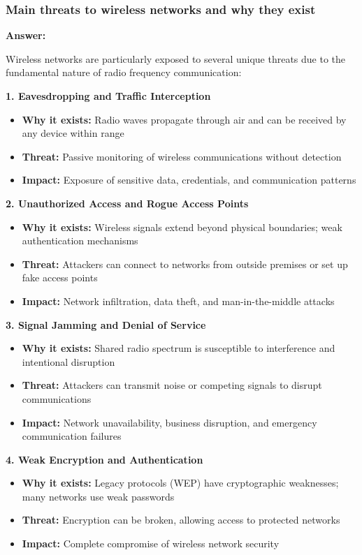 \documentclass[12pt,a4paper]{article}
\begin{document}
\subsubsection{Main threats to wireless networks and why they exist}

\textbf{Answer:}

Wireless networks are particularly exposed to several unique threats due to the fundamental nature of radio frequency communication:

\textbf{1. Eavesdropping and Traffic Interception}
\begin{itemize}
    \item \textbf{Why it exists:} Radio waves propagate through air and can be received by any device within range
    \item \textbf{Threat:} Passive monitoring of wireless communications without detection
    \item \textbf{Impact:} Exposure of sensitive data, credentials, and communication patterns
\end{itemize}

\textbf{2. Unauthorized Access and Rogue Access Points}
\begin{itemize}
    \item \textbf{Why it exists:} Wireless signals extend beyond physical boundaries; weak authentication mechanisms
    \item \textbf{Threat:} Attackers can connect to networks from outside premises or set up fake access points
    \item \textbf{Impact:} Network infiltration, data theft, and man-in-the-middle attacks
\end{itemize}

\textbf{3. Signal Jamming and Denial of Service}
\begin{itemize}
    \item \textbf{Why it exists:} Shared radio spectrum is susceptible to interference and intentional disruption
    \item \textbf{Threat:} Attackers can transmit noise or competing signals to disrupt communications
    \item \textbf{Impact:} Network unavailability, business disruption, and emergency communication failures
\end{itemize}

\textbf{4. Weak Encryption and Authentication}
\begin{itemize}
    \item \textbf{Why it exists:} Legacy protocols (WEP) have cryptographic weaknesses; many networks use weak passwords
    \item \textbf{Threat:} Encryption can be broken, allowing access to protected networks
    \item \textbf{Impact:} Complete compromise of wireless network security
\end{itemize}
\end{document}
